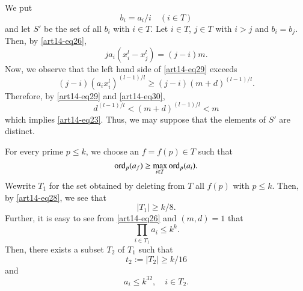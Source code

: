 We put
$$
b_{i}=a_{i}/i\quad (i\in T)
$$
and let $S'$ be the set of all $b_{i}$ with $i\in T$. Let $i\in T$, $j\in T$ with $i>j$ and $b_{i}=b_{j}$. Then, by \eqref{art14-eq26},
\begin{equation}
ja_{i}(x^{l}_{i}-x^{l}_{j})=(j-i)m.\label{art14-eq29}
\end{equation}
Now, we observe that the left hand side of \eqref{art14-eq29} exceeds
\begin{equation}
(j-i)(a_{i}x^{l}_{i})^{(l-1)/l}\geq (j-i)(m+d)^{(l-1)/l}.\label{art14-eq30}
\end{equation}
Therefore, by \eqref{art14-eq29} and \eqref{art14-eq30},
$$
d^{(l-1)/l}<(m+d)^{(l-1)/l}<m
$$
which implies \eqref{art14-eq23}. Thus, we may suppose that the elements of $S'$ are distinct.

For every prime $p\leq k$, we choose an $f=f(p)\in T$ such that 
$$
\operatorname{ord}_{p}(a_{f})\geq \max\limits_{i\in T}\operatorname{ord}_{p}(a_{i}).
$$
We\pageoriginale write $T_{1}$ for the set obtained by deleting from $T$ all $f(p)$ with $p\leq k$. Then, by \eqref{art14-eq28}, we see that
$$
|T_{1}|\geq k/8.
$$
Further, it is easy to see from \eqref{art14-eq26} and $(m,d)=1$ that
$$
\prod\limits_{i\in T_{1}}a_{i}\leq k^{k}.
$$
Then, there exists a subset $T_{2}$ of $T_{1}$ such that
\begin{equation}
t_{2}:= |T_{2}|\geq k/16\label{art14-eq31}
\end{equation}
and
\begin{equation}
a_{i}\leq k^{32},\quad i\in T_{2}.\label{art14-eq32}
\end{equation}

